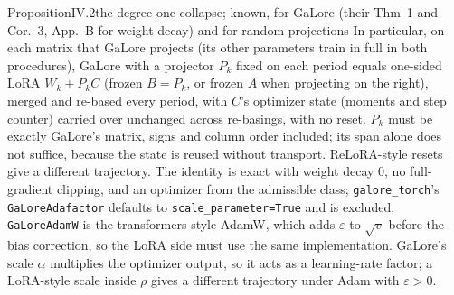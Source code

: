 \begin{restate}{Proposition}{IV.2}{the degree-one collapse; known, \citet{xtorrobahennigen2025duality} for GaLore (their
Thm~1 and Cor.~3, App.~B for weight decay) and \citet{hao2024flora} for random projections}
In particular, on each matrix that GaLore projects (its other parameters train in full in both procedures), GaLore with
a projector $P_k$ fixed on each period equals one-sided LoRA $W_k+P_kC$ (frozen $B=P_k$, or frozen $A$ when projecting
on the right), merged and re-based every period, with $C$'s optimizer state (moments and step counter) carried over
unchanged across re-basings, with no reset. $P_k$ must be exactly GaLore's matrix, signs and column order included; its
span alone does not suffice, because the state is reused without transport. ReLoRA-style resets give a different
trajectory. The identity is exact with weight decay $0$, no full-gradient clipping, and an optimizer from the admissible
class; \texttt{galore\_torch}'s \texttt{GaLoreAdafactor} defaults to \texttt{scale\_\allowbreak parameter=True} and is
excluded. \texttt{GaLoreAdamW} is the transformers-style AdamW, which adds $\varepsilon$ to $\sqrt v$ before the bias
correction, so the LoRA side must use the same implementation. GaLore's scale $\alpha$ multiplies the optimizer output, so
it acts as a learning-rate factor; a LoRA-style scale inside $\rho$ gives a different trajectory under Adam with
$\varepsilon>0$.
\end{restate}

